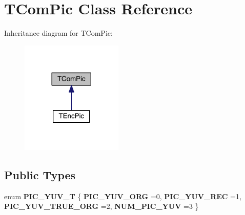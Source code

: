 \hypertarget{class_t_com_pic}{}\section{T\+Com\+Pic Class Reference}
\label{class_t_com_pic}


Inheritance diagram for T\+Com\+Pic\+:
\nopagebreak
\begin{figure}[H]
\begin{center}
\leavevmode
\includegraphics[width=137pt]{d7/d2c/class_t_com_pic__inherit__graph}
\end{center}
\end{figure}
\subsection*{Public Types}
\begin{DoxyCompactItemize}
\item 
\mbox{\label{class_t_com_pic_a0b04aee800198e60201685146d712669}} 
enum {\bfseries P\+I\+C\+\_\+\+Y\+U\+V\+\_\+T} \{ {\bfseries P\+I\+C\+\_\+\+Y\+U\+V\+\_\+\+O\+RG} =0, 
{\bfseries P\+I\+C\+\_\+\+Y\+U\+V\+\_\+\+R\+EC} =1, 
{\bfseries P\+I\+C\+\_\+\+Y\+U\+V\+\_\+\+T\+R\+U\+E\+\_\+\+O\+RG} =2, 
{\bfseries N\+U\+M\+\_\+\+P\+I\+C\+\_\+\+Y\+UV} =3
 \}
\end{DoxyCompactItemize}
